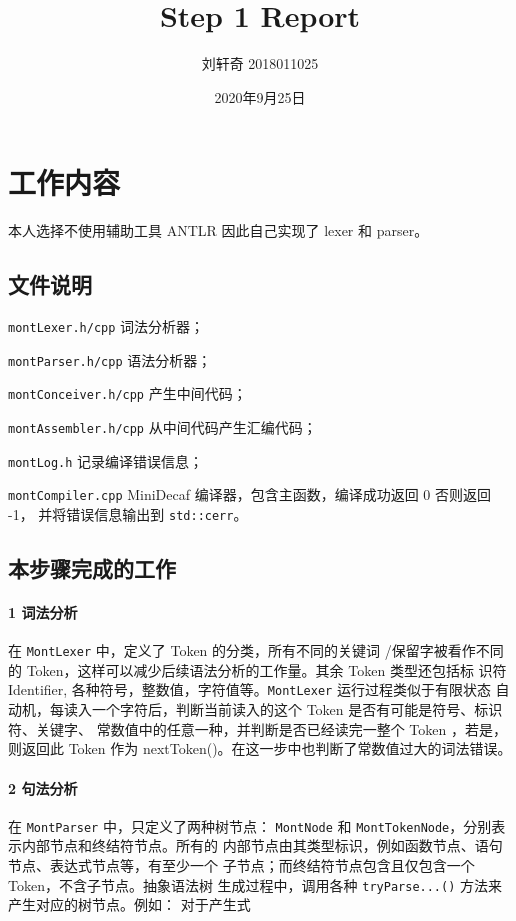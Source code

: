 \documentclass[UTF8]{ctexart}
\title{Step 1 Report}
\author{刘轩奇 2018011025}
\date{2020年9月25日}
\newcommand{\T}[1]{\texttt{{#1}}}
\begin{document}
    \maketitle
    \section{工作内容}
        本人选择不使用辅助工具 ANTLR 因此自己实现了 lexer 和 parser。
        \subsection{文件说明} 
            \T{montLexer.h/cpp} 词法分析器；

            \T{montParser.h/cpp} 语法分析器；

            \T{montConceiver.h/cpp} 产生中间代码；

            \T{montAssembler.h/cpp} 从中间代码产生汇编代码；
            
            \T{montLog.h} 记录编译错误信息；

            \T{montCompiler.cpp} MiniDecaf 编译器，包含主函数，编译成功返回 0 否则返回 -1，
            并将错误信息输出到 \T{std::cerr}。
        
        \subsection{本步骤完成的工作}

            \paragraph{1 词法分析} 在 \T{MontLexer} 中，定义了 Token 的分类，所有不同的关键词
            /保留字被看作不同的 Token，这样可以减少后续语法分析的工作量。其余 Token 类型还包括标
            识符 Identifier, 各种符号，整数值，字符值等。\T{MontLexer} 运行过程类似于有限状态
            自动机，每读入一个字符后，判断当前读入的这个 Token 是否有可能是符号、标识符、关键字、
            常数值中的任意一种，并判断是否已经读完一整个 Token ，若是，则返回此 Token 
            作为 nextToken()。在这一步中也判断了常数值过大的词法错误。

            \paragraph{2 句法分析} 在 \T{MontParser} 中，只定义了两种树节点： 
            \T{MontNode} 和 \T{MontTokenNode}，分别表示内部节点和终结符节点。所有的
            内部节点由其类型标识，例如函数节点、语句节点、表达式节点等，有至少一个
            子节点；而终结符节点包含且仅包含一个 Token，不含子节点。抽象语法树
            生成过程中，调用各种 \T{tryParse...()} 方法来产生对应的树节点。例如：
            对于产生式
\end{document}
